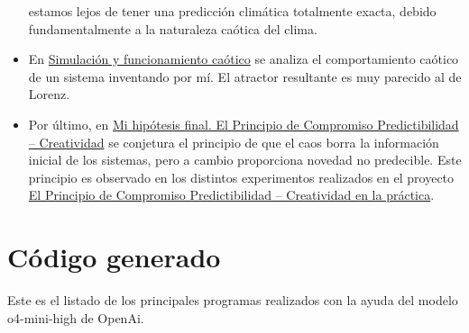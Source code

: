 \documentclass[
  10pt,
  a4paper,
  DIV=11,
  numbers=noendperiod,
  open=any]{scrreprt}
\numberwithin{equation}{chapter}
\numberwithin{equation}{section}
\renewcommand{\[}{\begin{equation}}
\renewcommand{\]}{\end{equation}}
\begin{document}
\begin{itemize}
  estamos lejos de tener una predicción climática totalmente exacta, debido
  fundamentalmente a la naturaleza caótica del clima.
\item
  En
  \href{https://colacaos.github.io/ColaCAOS/05-experimentos/intro.html}{Simulación
  y funcionamiento caótico} se analiza el comportamiento caótico de un
  sistema inventando por mí. El atractor resultante es muy parecido al
  de Lorenz.
\item
  Por último, en
  \href{https://colacaos.github.io/ColaCAOS/06-filosofia/determinismo07.html}{Mi
  hipótesis final. El Principio de Compromiso Predictibilidad --
  Creatividad} se conjetura el principio de que el caos borra la
  información inicial de los sistemas, pero a cambio proporciona novedad
  no predecible. Este principio es observado en los distintos
  experimentos realizados en el proyecto
  \href{https://colacaos.github.io/ColaCAOS/06-filosofia/determinismo08.html}{El
  Principio de Compromiso Predictibilidad -- Creatividad en la
  práctica}.
\end{itemize}

\section{Código generado}\label{cuxf3digo-generado}

Este es el listado de los principales programas realizados con la ayuda
del modelo o4-mini-high de OpenAi.
\end{document}
